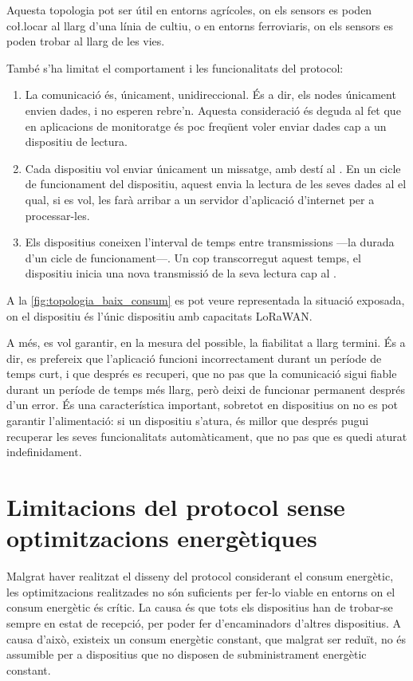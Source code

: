 \documentclass{tfgitic}[2024/07/01]
\begin{document}
{Aquesta topologia pot ser útil en entorns agrícoles, on els sensors es poden co\l.locar al llarg d'una línia de cultiu, o en entorns ferroviaris, on els sensors es poden trobar al llarg de les vies. 

També s'ha limitat el comportament i les funcionalitats del protocol:
\begin{enumerate}
    \item La comunicació és, únicament, unidireccional. És a dir, els nodes únicament envien dades, i no esperen rebre'n. Aquesta consideració és deguda al fet que en aplicacions de monitoratge és poc freqüent voler enviar dades cap a un dispositiu de lectura.
    \item Cada dispositiu vol enviar únicament un missatge, amb destí al . En un cicle de funcionament del dispositiu, aquest envia la lectura de les seves dades al  el qual, si es vol, les farà arribar a un servidor d'aplicació d'internet per a processar-les.
    \item Els dispositius coneixen l'interval de temps entre transmissions ---la durada d'un cicle de funcionament---. Un cop transcorregut aquest temps, el dispositiu inicia una nova transmissió de la seva lectura cap al .
\end{enumerate}

A la \autoref{fig:topologia_baix_consum} es pot veure representada la situació exposada, on el dispositiu  és l'únic dispositiu amb capacitats LoRaWAN.

A més, es vol garantir, en la mesura del possible, la fiabilitat a llarg termini. És a dir, es prefereix que l'aplicació funcioni incorrectament durant un període de temps curt, i que després es recuperi, que no pas que la comunicació sigui fiable durant un període de temps més llarg, però deixi de funcionar permanent després d'un error. És una característica important, sobretot en dispositius on no es pot garantir l'alimentació: si un dispositiu s'atura, és millor que després pugui recuperar les seves funcionalitats automàticament, que no pas que es quedi aturat indefinidament.

\section{Limitacions del protocol sense optimitzacions energètiques}
Malgrat haver realitzat el disseny del protocol considerant el consum energètic, les optimitzacions realitzades no són suficients per fer-lo viable en entorns on el consum energètic és crític. La causa és que tots els dispositius han de trobar-se sempre en estat de recepció, per poder fer d'encaminadors d'altres dispositius. A causa d'això, existeix un consum energètic constant, que malgrat ser reduït, no és assumible per a dispositius que no disposen de subministrament energètic constant.

}
\end{document}
